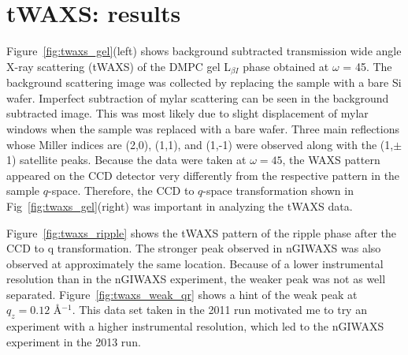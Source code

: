 


\newpage
\section{tWAXS: results}\label{sec:tWAXS_results}
Figure~\ref{fig:twaxs_gel}(left) shows background subtracted transmission wide
angle X-ray scattering (tWAXS) of the DMPC gel L$_{\beta I}$ phase obtained at 
$\omega$ = 45\textdegree.
The background scattering image was collected by replacing 
the sample with a bare Si wafer. Imperfect subtraction of mylar scattering 
can be seen in the background subtracted image. 
This was most likely due to slight displacement of mylar windows
when the sample was replaced with a bare wafer. Three main reflections whose Miller indices 
are (2,0), (1,1), and (1,-1) were observed along with the (1,$\pm$1) satellite 
peaks.
Because the data were taken at $\omega=45$\textdegree, the WAXS pattern 
appeared on the CCD detector very differently from the respective pattern
in the sample $q$-space. 
Therefore, the CCD to $q$-space transformation shown in 
Fig~\ref{fig:twaxs_gel}(right) was important in analyzing the tWAXS data. 

Figure~\ref{fig:twaxs_ripple} shows the tWAXS pattern of the ripple phase 
after the CCD to q transformation. The stronger
peak observed in nGIWAXS was also observed at approximately the same location.
Because of a lower instrumental resolution than in the nGIWAXS experiment,
the weaker peak was not as well separated. Figure~\ref{fig:twaxs_weak_qr} shows
a hint of the weak peak at $q_z=0.12$ \AA$^{-1}$. This
data set taken in the 2011 run motivated me to try an experiment
with a higher instrumental resolution, which led to the nGIWAXS experiment
in the 2013 run. 

